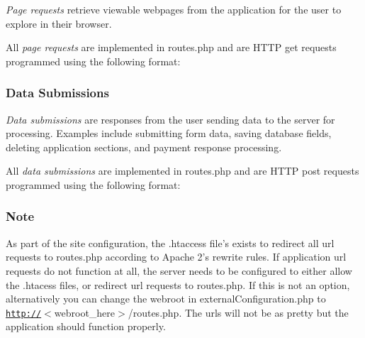{\itshape Page requests} retrieve viewable webpages from the application for the user to explore in their browser.

All {\itshape page requests} are implemented in routes.\-php and are H\-T\-T\-P get requests programmed using the following format\-: 


\subsubsection*{Data Submissions}

{\itshape Data submissions} are responses from the user sending data to the server for processing. Examples include submitting form data, saving database fields, deleting application sections, and payment response processing.

All {\itshape data submissions} are implemented in routes.\-php and are H\-T\-T\-P post requests programmed using the following format\-: 


\subsubsection*{Note}

As part of the site configuration, the .htaccess file's exists to redirect all url requests to routes.\-php according to Apache 2's rewrite rules. If application url requests do not function at all, the server needs to be configured to either allow the .htacess files, or redirect url requests to routes.\-php. If this is not an option, alternatively you can change the webroot in external\-Configuration.\-php to \href{http://}{\tt http\-://}$<$webroot\-\_\-here$>$/routes.php. The urls will not be as pretty but the application should function properly.


